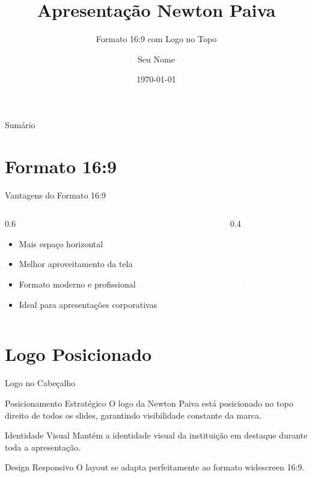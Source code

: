 \documentclass[aspectratio=169]{beamer}
\title{Apresentação Newton Paiva}
\subtitle{Formato 16:9 com Logo no Topo}
\author{Seu Nome}
\institute{Centro Universitário Newton Paiva}
\date{\today}
\begin{document}
\begin{frame}
    \titlepage
\end{frame}

\begin{frame}{Sumário}
    \tableofcontents
\end{frame}

\section{Formato 16:9}
\begin{frame}{Vantagens do Formato 16:9}
    \begin{columns}
        \begin{column}{0.6\textwidth}
            \begin{itemize}
                \item Mais espaço horizontal
                \item Melhor aproveitamento da tela
                \item Formato moderno e profissional
                \item Ideal para apresentações corporativas
            \end{itemize}
        \end{column}
        \begin{column}{0.4\textwidth}
            \begin{center}
                \textcolor{white}{\large\textbf{16:9}}
                \vspace{0.5cm}
                
                \textcolor{white}{vs}
                \vspace{0.5cm}
                
                \textcolor{white}{\large\textbf{4:3}}
            \end{center}
        \end{column}
    \end{columns}
\end{frame}

\section{Logo Posicionado}
\begin{frame}{Logo no Cabeçalho}
    \begin{block}{Posicionamento Estratégico}
        O logo da Newton Paiva está posicionado no topo direito de todos os slides, garantindo visibilidade constante da marca.
    \end{block}
    
    \begin{alertblock}{Identidade Visual}
        Mantém a identidade visual da instituição em destaque durante toda a apresentação.
    \end{alertblock}
    
    \begin{exampleblock}{Design Responsivo}
        O layout se adapta perfeitamente ao formato widescreen 16:9.
    \end{exampleblock}
\end{frame}
\end{document}
